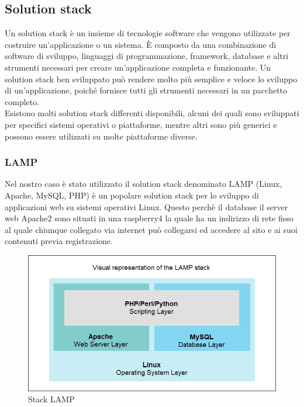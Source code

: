 \documentclass[a4paper,final,12pt]{report}
\begin{document}
\subsection{Solution stack}
Un solution stack è un insieme di tecnologie software che vengono utilizzate per costruire un'applicazione o un sistema. È composto da una combinazione di software di sviluppo, linguaggi di programmazione, framework, database e altri strumenti necessari per creare un'applicazione completa e funzionante.
Un solution stack ben sviluppato può rendere molto più semplice e veloce lo sviluppo di un'applicazione, poiché fornisce tutti gli strumenti necessari in un pacchetto completo.\\ 
Esistono molti solution stack differenti disponibili, alcuni dei quali sono sviluppati per specifici sistemi operativi o piattaforme, mentre altri sono più generici e possono essere utilizzati su molte piattaforme diverse.\\

\subsubsection{LAMP}
Nel nostro caso è stato utilizzato il solution stack denominato LAMP (Linux, Apache, MySQL, PHP) è un popolare solution stack per lo sviluppo di applicazioni web su sistemi operativi Linux. Questo perchè il database il server web Apache2 sono situati in una raspberry4 la quale ha un indirizzo di rete fisso al quale chiunque collegato via internet può collegarsi ed accedere al sito e ai suoi contenuti previa registrazione.
\begin{figure}[hbtp]
\centering
\includegraphics[scale=0.47]{img_concettuale/LAMP.png}
\caption{Stack LAMP}
\end{figure} 
\end{document}

